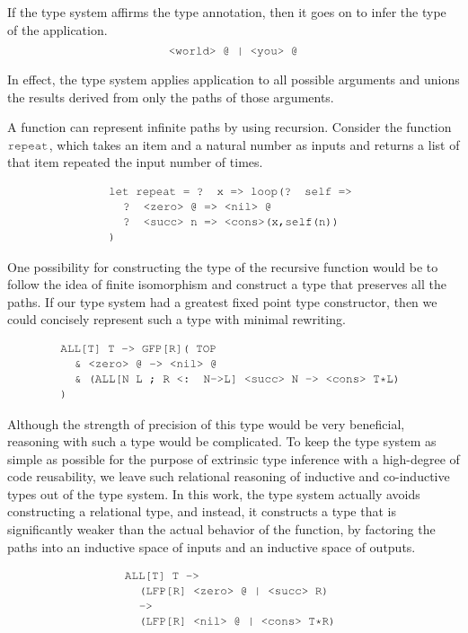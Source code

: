 \documentclass[acmsmall]{acmart}
\theoremstyle{definition}
\begin{document}
If the type system affirms the type annotation,
then it goes on to infer the type of the application. 
\[
  \J{<world> @ | <you> @}
\]

In effect, the type system applies application to all possible arguments
and unions the results derived from only the paths of those arguments. 

A function can represent infinite paths by using recursion.
Consider the function $\J{repeat}$, which takes an item and a natural number
as inputs and returns a list of that item repeated the input number of times.

\[
  \begin{array}[t]{@{} l}
      \J{let repeat = ? x => loop(? self =>}
      \\
      \I \J{? <zero> @ => <nil> @}
      \\
      \I \J{? <succ> n => <cons>(x,self(n))}
      \\
      \J{)}
  \end{array}
\]

One possibility for constructing the type of the recursive function would
be to follow the idea of finite isomorphism and construct a type 
that preserves all the paths. If our type system had a greatest fixed point
type constructor, then we could concisely represent such a type with minimal
rewriting.

\[
  \begin{array}[t]{@{} l}
      \J{ALL[T] T -> GFP[R]( TOP} 
      \\
      \I \J{\& <zero> @ -> <nil> @}
      \\
      \I \J{\& (ALL[N L ; R <: N->L] <succ> N -> <cons> T*L)}
      \\
      \J{)} 
  \end{array}
\]

Although the strength of precision of this type would be very beneficial,
reasoning with such a type would be complicated. To keep the type system as
simple as possible for the purpose of extrinsic type inference with a high-degree
of code reusability, we leave such relational reasoning of inductive and co-inductive types out of
the type system. 
In this work, the type system actually avoids constructing a relational type, and instead, it
constructs a type that is significantly weaker than the actual behavior of the function,
by factoring the paths into an inductive space of inputs and an inductive space of outputs. 

\[
  \begin{array}[t]{@{} l}
      \J{ALL[T] T ->} 
      \\
      \I \J{(LFP[R] <zero> @ | <succ> R)}
      \\
      \I \J{->}
      \\
      \I \J{(LFP[R] <nil> @ | <cons> T*R)}
  \end{array}
\]
\end{document}
